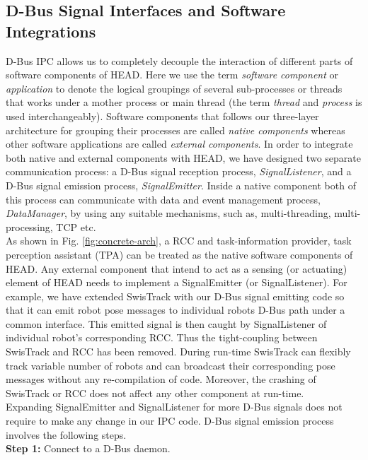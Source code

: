 \documentclass[draft]{ifacconf}
\begin{document}
\subsection{D-Bus Signal Interfaces and Software Integrations}
D-Bus IPC allows us to completely decouple the interaction of different parts of software components of HEAD. Here we use the term {\em software component} or {\em application} to denote the logical groupings of several sub-processes or threads that works under a mother process or main thread (the term {\em thread} and {\em process} is used interchangeably). Software components that follows our three-layer architecture for grouping their processes are called {\em native components} whereas other software applications are called {\em external components}. In order to integrate both native and external components with HEAD, we have designed two separate communication process: a D-Bus signal reception process, {\em SignalListener}, and a D-Bus signal emission process, {\em SignalEmitter}. Inside a native component both of this process can communicate with data and event management process, {\em DataManager}, by using any suitable mechanisms, such as, multi-threading, multi-processing, TCP etc.\\
%
As shown in Fig. \ref{fig:concrete-arch}, a RCC and task-information provider, task perception assistant (TPA) can be treated as the native software components of HEAD. Any external component that intend to act as a sensing (or actuating) element of HEAD needs to implement a SignalEmitter (or SignalListener). For example, we have extended SwisTrack  with our D-Bus signal emitting code so that it can emit robot pose messages to individual robots D-Bus path under a common interface. This emitted signal is then caught by SignalListener of individual robot's corresponding RCC. Thus the tight-coupling between SwisTrack and RCC has been removed. During run-time SwisTrack can flexibly track variable number of robots and can broadcast their corresponding pose messages without any re-compilation of code. Moreover, the crashing of SwisTrack or RCC does not affect any other component at run-time.\\
Expanding SignalEmitter and SignalListener for more D-Bus signals does not require to make any change in our IPC code. D-Bus signal emission process involves the following steps.\\
\textbf{Step 1:} Connect to a D-Bus daemon. \\
\end{document}
